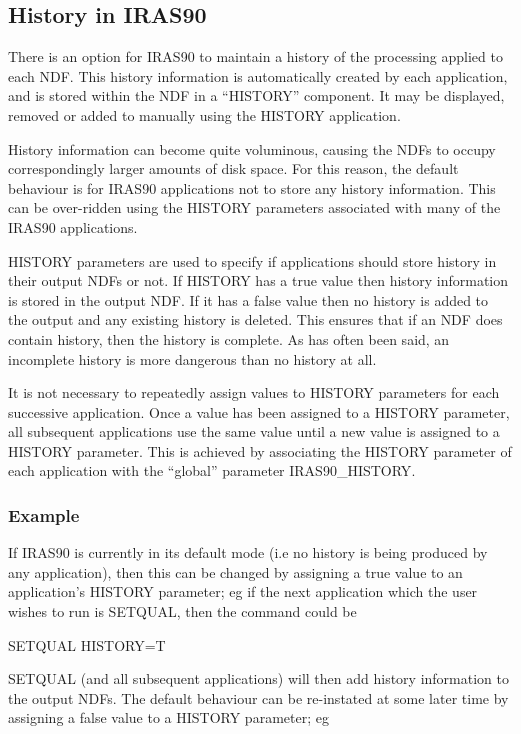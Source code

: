 \documentclass[11pt,nolof,noabs]{starlink}
\begin{document}
\subsection{History in IRAS90}
\label{SEC:HIS}
There is an option for {\small IRAS90} to maintain a history of the
processing applied to each {\small NDF}. This history information is
automatically created by each application, and is
stored within the {\small NDF} in a ``{\small HISTORY}'' component. It may be
displayed, removed or added to manually using the {\small HISTORY}
application.

History information can become quite voluminous, causing the {\small NDF}s
to occupy correspondingly larger amounts of disk space. For this
reason, the default behaviour is for {\small IRAS90} applications not to
store any history information. This can be over-ridden using the
{\small HISTORY} parameters associated with many of the {\small IRAS90}
applications.

{\small HISTORY} parameters are used to specify if applications should
store history in their output {\small NDF}s or not. If {\small HISTORY} has a true
value then history information is stored in the output {\small NDF}. If
it has a false value then no history is added to the output and
any existing history is deleted. This ensures that if an {\small NDF}
does contain history, then the history is complete. As has often
been said, an incomplete history is more dangerous than no
history at all.

It is not necessary to repeatedly assign values to {\small HISTORY}
parameters for each successive application. Once a value has
been assigned to a {\small HISTORY} parameter, all subsequent
applications use the same value until a new value is assigned
to a {\small HISTORY} parameter. This is achieved by associating the
{\small HISTORY} parameter of each application with the ``global''
parameter {\small IRAS90\_HISTORY}.

\subsubsection{Example}
If {\small IRAS90} is currently in its default mode (i.e no history is
being produced by any application), then this can be changed by
assigning a true value to an application's {\small HISTORY} parameter; eg
if the next application which the user wishes to run is {\small SETQUAL},
then the command could be

\small
\begin{terminalv}
SETQUAL HISTORY=T
\end{terminalv}
\normalsize
{\small SETQUAL} (and all subsequent applications) will then add history
information to the output {\small NDF}s. The default behaviour can be
re-instated at some later time by assigning a false value to a
{\small HISTORY} parameter; eg
\end{document}
